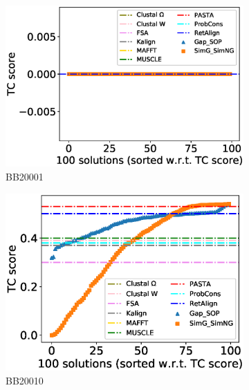 \begin{figure}[!htbp]
	\centering
	\begin{adjustwidth}{-1.5cm}{-1cm}
		\begin{subfigure}{0.22\textwidth}
			\includegraphics[width=\columnwidth]{Figure/summary/precomputedInit/Balibase/BB20001_tc_density_single_run_2}
			\caption{BB20001}
		\end{subfigure}	
		\begin{subfigure}{0.22\textwidth}
			\includegraphics[width=\columnwidth]{Figure/summary/precomputedInit/Balibase/BB20010_tc_density_single_run_2}
			\caption{BB20010}
		\end{subfigure}
		\begin{subfigure}{0.22\textwidth}

\end{subfigure}
\end{adjustwidth}
\end{figure}
